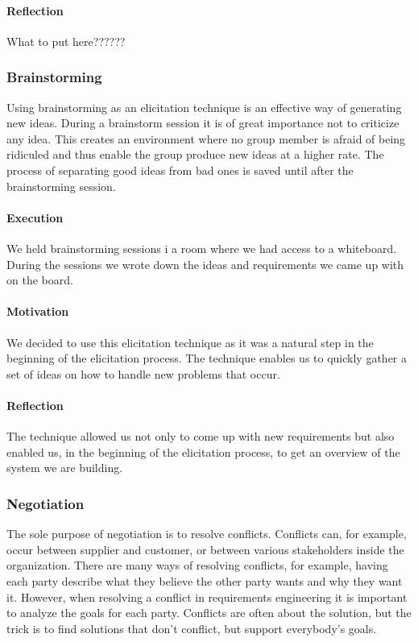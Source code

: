\documentclass[10pt]{article}
\begin{document}
\paragraph{Reflection}
What to put here??????

\subsubsection{Brainstorming}
Using brainstorming as an elicitation technique is an effective way of generating new ideas. During a brainstorm session it is of great importance not to criticize any idea. This creates an environment where no group member is afraid of being ridiculed and thus enable the group produce new ideas at a higher rate.
The process of separating good ideas from bad ones is saved until after the brainstorming session.
\paragraph{Execution}
We held brainstorming sessions i a room where we had access to a whiteboard. During the sessions we wrote down the ideas and requirements we came up with on the board.
\paragraph{Motivation}
We decided to use this elicitation technique as it was a natural step in the beginning of the elicitation process. The technique enables us to quickly gather a set of ideas on how to handle new problems that occur.
\paragraph{Reflection}
The technique allowed us not only to come up with new requirements but also enabled us, in the beginning of the elicitation process, to get an overview of the system we are building.


\subsubsection{Negotiation}
The sole purpose of negotiation is to resolve conflicts. Conflicts can, for example, occur between supplier and customer, or between various stakeholders inside the organization. There are many ways of resolving conflicts, for example, having each party describe what they believe the other party wants and why they want it. However, when resolving a conflict in requirements engineering it is important to analyze the goals for each party. Conflicts are often about the solution, but the trick is to find solutions that don’t conflict, but support everybody’s goals.
\end{document}

